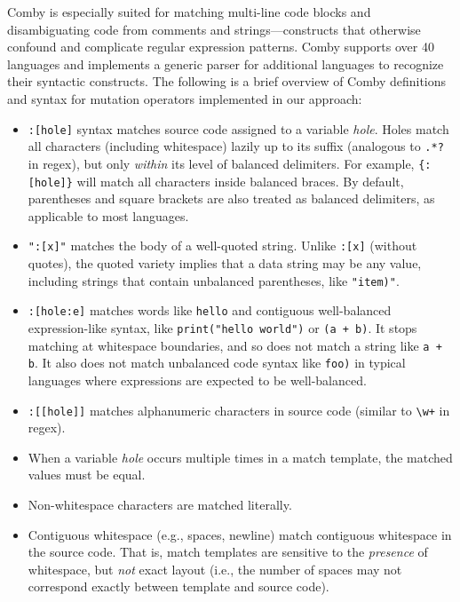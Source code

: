 \documentclass[sigconf,review, anonymous]{acmart}
\begin{document}
{Comby is especially suited for matching multi-line code blocks and
disambiguating code from comments and strings---constructs that otherwise
confound and complicate regular expression patterns. Comby supports over 40
languages and implements a generic parser for additional languages to recognize
their syntactic constructs. The following is a brief overview of Comby
definitions and syntax for mutation operators implemented in our approach:

\begin{itemize}

\item \texttt{\small:[hole]} syntax matches source code assigned to a variable \emph{hole}. Holes match all characters (including whitespace) lazily up to its suffix (analogous to \texttt{\small.*?} in regex), but only \emph{within} its level of balanced delimiters. For example, \texttt{\small\{:[hole]\}} will match all characters inside balanced braces. By default, parentheses and square brackets are also treated as balanced delimiters, as applicable to most languages. 

\item \texttt{\small ":[x]"} matches the body of a well-quoted string. Unlike \texttt{\small :[x]} (without quotes), the quoted variety implies that a data string may be any value, including strings that contain unbalanced parentheses, like \texttt{\small "item)"}.

\item \texttt{\small:[hole:e]} matches words like \texttt{\small hello} and contiguous well-balanced expression-like syntax, like \texttt{\small print("hello world")} or \texttt{\small (a + b)}. It stops matching at whitespace boundaries, and so does not match a string like \texttt{\small a + b}. It also does not match unbalanced code syntax like \texttt{\small foo)} in typical languages where expressions are expected to be well-balanced.

\item \texttt{\small :[[hole]]} matches alphanumeric characters in source code (similar to \texttt{\small\textbackslash w+} in regex).

\item When a variable \emph{hole} occurs multiple times in a match
  template, the matched values must be equal.

\item Non-whitespace characters are matched literally.

\item Contiguous whitespace (e.g., spaces, newline) match contiguous whitespace in the source code. That is, match templates are sensitive to the \emph{presence} of whitespace, but \emph{not} exact layout (i.e., the number of spaces may not correspond exactly between template and source code).


\end{itemize}}
\end{document}
